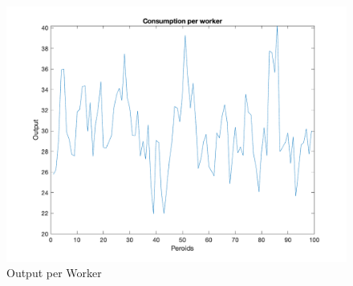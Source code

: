 \documentclass[12pt,oneside,reqno]{amsart}
\begin{document}
\begin{enumerate}
\begin{enumerate}
    \begin{figure}[h]
        \centering
        \includegraphics[width =.5\linewidth]{HW1/pics/HW1_Q3_b2.png}
        \caption{Output per Worker}
    \end{figure}
\end{enumerate}

\end{enumerate}
\end{document}
